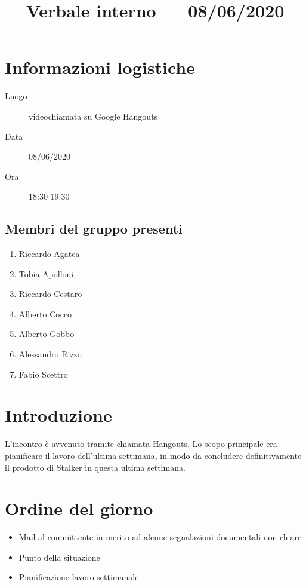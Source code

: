 \documentclass{article}
\title{Verbale interno --- 08/06/2020}
\begin{document}


\section{Informazioni logistiche}%
\label{sec:informazioni_logistiche}

\begin{description}
  \item [Luogo] videochiamata su Google Hangouts
  \item [Data] 08/06/2020
  \item [Ora] 18:30  19:30
\end{description}

\subsection{Membri del gruppo presenti}%
\label{sub:membri_del_gruppo_presenti}

\begin{enumerate}
  \item Riccardo Agatea
  \item Tobia Apolloni
  \item Riccardo Cestaro
  \item Alberto Cocco
  \item Alberto Gobbo
  \item Alessandro Rizzo
  \item Fabio Scettro
\end{enumerate}

\section{Introduzione}%
\label{sec:introduzione}
L'incontro è avvenuto tramite chiamata Hangouts.
Lo scopo principale era pianificare il lavoro dell'ultima settimana, in modo da concludere definitivamente il prodotto di Stalker in questa ultima settimana.

\section{Ordine del giorno}%
\label{sec:ordine_del_giorno}

\begin{itemize}
  \item Mail al committente in merito ad alcune segnalazioni documentali non chiare
  \item Punto della situazione
  \item Pianificazione lavoro settimanale
\end{itemize}
\end{document}
